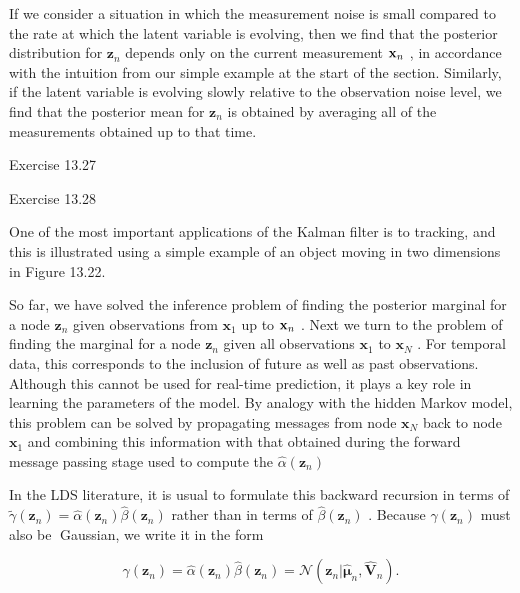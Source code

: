 \documentclass[
  10
]{article}
\begin{document}
If we consider a situation in which the measurement noise is small
compared to the rate at which the latent variable is evolving, then we
find that the posterior distribution for \(\mathbf { z } _ { n }\)
depends only on the current measurement \({ \bf x } _ { n }\) , in
accordance with the intuition from our simple example at the start of
the section. Similarly, if the latent variable is evolving slowly
relative to the observation noise level, we find that the posterior mean
for \(\mathbf { z } _ { n }\) is obtained by averaging all of the
measurements obtained up to that time.

Exercise 13.27

Exercise 13.28

One of the most important applications of the Kalman filter is to
tracking, and this is illustrated using a simple example of an object
moving in two dimensions in Figure 13.22.

So far, we have solved the inference problem of finding the posterior
marginal for a node \(\mathbf { z } _ { n }\) given observations from
\(\mathbf { x } _ { 1 }\) up to \({ \bf x } _ { n }\) . Next we turn to
the problem of finding the marginal for a node \(\mathbf { z } _ { n }\)
given all observations \(\mathbf { x } _ { 1 }\) to
\(\mathbf { x } _ { N }\) . For temporal data, this corresponds to the
inclusion of future as well as past observations. Although this cannot
be used for real-time prediction, it plays a key role in learning the
parameters of the model. By analogy with the hidden Markov model, this
problem can be solved by propagating messages from node
\(\mathbf { x } _ { N }\) back to node \(\mathbf { x } _ { 1 }\) and
combining this information with that obtained during the forward message
passing stage used to compute the
\(\widehat { \alpha } ( \mathbf { z } _ { n } )\)

In the LDS literature, it is usual to formulate this backward recursion
in terms of
\(\widetilde { \gamma } ( \mathbf { z } _ { n } ) = \widehat { \alpha } ( \mathbf { z } _ { n } ) \widehat { \beta } ( \mathbf { z } _ { n } )\)
rather than in terms of \(\widehat { \beta } ( \mathbf { z } _ { n } )\)
. Because \(\gamma ( \mathbf { z } _ { n } )\) must also be Gaussian, we
write it in the form

\[
\gamma (\mathbf {z} _ {n}) = \widehat {\alpha} (\mathbf {z} _ {n}) \widehat {\beta} (\mathbf {z} _ {n}) = \mathcal {N} (\mathbf {z} _ {n} | \widehat {\boldsymbol {\mu}} _ {n}, \widehat {\mathbf {V}} _ {n}).\tag{13.98}
\]
\end{document}
